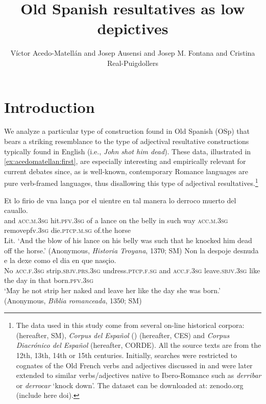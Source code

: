 \documentclass[output=paper,colorlinks,citecolor=brown,
]{langscibook}
\author{Víctor Acedo-Matellán\affiliation{University of Oxford} and Josep Ausensi\affiliation{Universitat Pompeu Fabra} and  Josep M. Fontana\affiliation{Universitat Pompeu Fabra} and  Cristina Real-Puigdollers\affiliation{Universitat Pompeu Fabra}}
\title{Old Spanish resultatives as low depictives}
\begin{document}
\maketitle

\section{Introduction}\label{sec:acedomatellan:1}
We analyze a particular type of construction found in Old Spanish (OSp) that bears a striking resemblance to the type of adjectival resultative constructions typically found in English (i.e., \textit{John shot him dead}). These data, illustrated in \ref{ex:acedomatellan:first}, are especially interesting and empirically relevant for current debates since, as is well-known, contemporary Romance languages are pure verb-framed languages, thus disallowing this type of adjectival resultatives.\footnote{The data used in this study come from several on-line historical corpora: \citet{Sanchez-Marcoetal2010} (hereafter, SM), \textit{Corpus del Español} (\citealt{Davies2002}) (hereafter, CES) and \textit{Corpus Diacrónico del Español} \citep{Corde} (hereafter, CORDE). All the source texts are from the 12th, 13th, 14th or 15th centuries. Initially, searches were restricted to cognates of the Old French verbs and adjectives discussed in \citet{troberg2014predicat} and were later extended to similar verbs/adjectives native to Ibero-Romance such as \textit{derribar} or \textit{derrocar} ‘knock down’. The dataset can be downloaded at: zenodo.org (include here doi). }

\ea\label{ex:acedomatellan:first}
  \ea
    \gll Et lo firio	de	vna	lança	por el 	uientre 	en	tal manera	lo derroco muerto del cauallo.\\ 
			and	\textsc{acc}.\textsc{m}.\textsc{3sg}	hit.\textsc{pfv}.\textsc{3sg}		of	a 		lance	on 	the 	belly	in	such	way \textsc{acc}.\textsc{m}.\textsc{3sg}	remove{pfv}.\textsc{3sg}	die.\textsc{ptcp}.\textsc{m}.\textsc{sg}		of.the	horse\\
    \glt Lit. `And the blow of his lance on his belly was such that he	knocked 			him dead off the horse.’ (Anonymous, \textit{Historia Troyana}, 1370; SM)
  \ex
    \gll Non 	la despoje desnuda e la dexe como  el dia 	en 	que    nasçio.	\\
			No		\textsc{acc}.\textsc{f}.\textsc{3sg}			strip.\textsc{sbjv}.\textsc{prs}.\textsc{3sg}			undress.\textsc{ptcp}.\textsc{f}.\textsc{sg}	and 	\textsc{acc}.\textsc{f}.\textsc{3sg}  	leave.\textsc{sbjv}.\textsc{3sg} like			the		day	in 		that 		born.\textsc{pfv}.\textsc{3sg}\\
    \glt `May he not strip her naked and leave her like the day she was born.’ (Anonymous, \textit{Biblia romanceada}, 1350; SM)
  \z 
\z 
\end{document}
